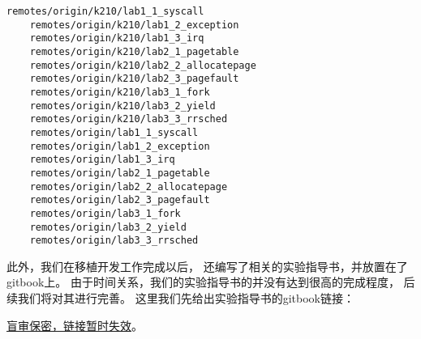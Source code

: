 \begin{lstlisting}[caption={分支列表}, label={lst:branch_list_1}]
    remotes/origin/k210/lab1_1_syscall
    remotes/origin/k210/lab1_2_exception
    remotes/origin/k210/lab1_3_irq
    remotes/origin/k210/lab2_1_pagetable
    remotes/origin/k210/lab2_2_allocatepage
    remotes/origin/k210/lab2_3_pagefault
    remotes/origin/k210/lab3_1_fork
    remotes/origin/k210/lab3_2_yield
    remotes/origin/k210/lab3_3_rrsched
    remotes/origin/lab1_1_syscall
    remotes/origin/lab1_2_exception
    remotes/origin/lab1_3_irq
    remotes/origin/lab2_1_pagetable
    remotes/origin/lab2_2_allocatepage
    remotes/origin/lab2_3_pagefault
    remotes/origin/lab3_1_fork
    remotes/origin/lab3_2_yield
    remotes/origin/lab3_3_rrsched
\end{lstlisting}

此外，我们在移植开发工作完成以后，
还编写了相关的实验指导书，并放置在了gitbook上。
由于时间关系，我们的实验指导书的并没有达到很高的完成程度，
后续我们将对其进行完善。
这里我们先给出实验指导书的gitbook链接：

\href{https://baidu.com}{盲审保密，链接暂时失效}。
